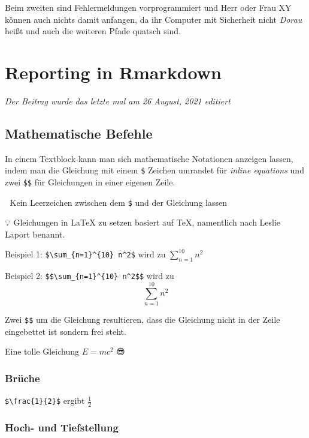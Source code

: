 \documentclass[
]{article}
\begin{document}
Beim zweiten sind Fehlermeldungen vorprogrammiert und Herr oder Frau XY können auch nichts damit anfangen, da ihr Computer mit Sicherheit nicht \emph{Dorau} heißt und auch die weiteren Pfade quatsch sind.

\hypertarget{reporting-in-rmarkdown}{%
\section{Reporting in Rmarkdown}\label{reporting-in-rmarkdown}}

\emph{Der Beitrag wurde das letzte mal am 26 August, 2021 editiert}

\hypertarget{mathematische-befehle}{%
\subsection{Mathematische Befehle}\label{mathematische-befehle}}

In einem Textblock kann man sich mathematische Notationen anzeigen lassen, indem man die Gleichung mit einem \texttt{\$} Zeichen umrandet für \emph{inline equations} und zwei \texttt{\$\$} für Gleichungen in einer eigenen Zeile.

🚨 Kein Leerzeichen zwischen dem \texttt{\$} und der Gleichung lassen

💡 Gleichungen in LaTeX zu setzen basiert auf TeX, namentlich nach Leslie Laport benannt.

Beispiel 1: \texttt{\$\textbackslash{}sum\_\{n=1\}\^{}\{10\}\ n\^{}2\$} wird zu \(\sum_{n=1}^{10} n^2\)

Beispiel 2: \texttt{\$\$\textbackslash{}sum\_\{n=1\}\^{}\{10\}\ n\^{}2\$\$} wird zu \[\sum_{n=1}^{10} n^2\]

Zwei \texttt{\$\$} um die Gleichung resultieren, dass die Gleichung nicht in der Zeile eingebettet ist sondern frei steht.

Eine tolle Gleichung \(E=mc^2\) 😎

\hypertarget{bruxfcche}{%
\subsubsection{Brüche}\label{bruxfcche}}

\texttt{\$\textbackslash{}frac\{1\}\{2\}\$} ergibt \(\frac{1}{2}\)

\hypertarget{hoch--und-tiefstellung}{%
\subsubsection{Hoch- und Tiefstellung}\label{hoch--und-tiefstellung}}
\end{document}
